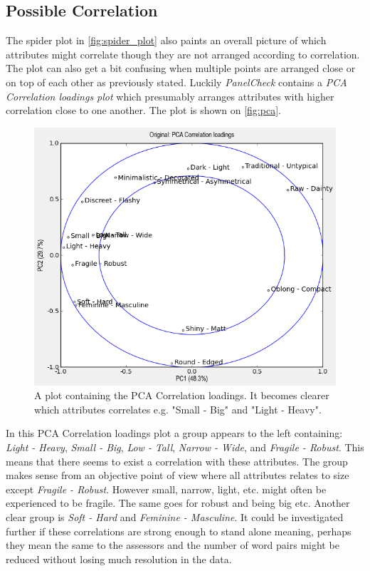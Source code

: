 \subsection*{Possible Correlation}
The spider plot in \autoref{fig:spider_plot} also paints an overall picture of which attributes might correlate though they are not arranged according to correlation. The plot can also get a bit confusing when multiple points are arranged close or on top of each other as previously stated. Luckily \textit{PanelCheck} contains a \textit{PCA Correlation loadings plot} which presumably arranges attributes with higher correlation close to one another. The plot is shown on \autoref{fig:pca}.
%
\begin{figure}[H]
\centering
\includegraphics[width = \textwidth]{Figure/PCA_correlations.png}
\caption{A plot containing the PCA Correlation loadings. It becomes clearer which attributes correlates e.g. "Small - Big" and "Light - Heavy".}
\label{fig:pca}
\end{figure}
\noindent
%
In this PCA Correlation loadings plot a group appears to the left containing: \textit{Light - Heavy}, \textit{Small - Big}, \textit{Low - Tall}, \textit{Narrow - Wide}, and \textit{Fragile - Robust}. This means that there seems to exist a correlation with these attributes. The group makes sense from an objective point of view where all attributes relates to size except \textit{Fragile - Robust}. However small, narrow, light, etc. might often be experienced to be fragile. The same goes for robust and being big etc. Another clear group is \textit{Soft - Hard} and \textit{Feminine - Masculine}. It could be investigated further if these correlations are strong enough to stand alone meaning, perhaps they mean the same to the assessors and the number of word pairs might be reduced without losing much resolution in the data.